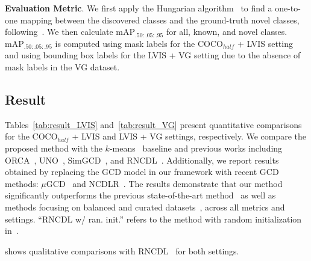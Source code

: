 
\vspace{1mm}
\noindent \textbf{Evaluation Metric}. 
We first apply the Hungarian algorithm~\cite{kuhn1955hungarian} to find a one-to-one mapping between the discovered classes and the ground-truth novel classes, following~\cite{fomenko2022learning}. We then calculate $\text{mAP}_{.50:.05:.95}$ for all, known, and novel classes. $\text{mAP}_{.50:.05:.95}$ is computed using mask labels for the COCO$_{half}$ + LVIS setting and using bounding box labels for the LVIS + VG setting due to the absence of mask labels in the VG dataset.



\subsection{Result}
Tables~\ref{tab:result_LVIS} and~\ref{tab:result_VG} present quantitative comparisons for the COCO$_{half}$ + LVIS and LVIS + VG settings, respectively. We compare the proposed method with the $k$-means~\cite{macqueen1967some} baseline and previous works including ORCA~\cite{cao2021open}, UNO~\cite{fini2021unified}, SimGCD~\cite{wen2023parametric}, and RNCDL~\cite{fomenko2022learning}. Additionally, we report results obtained by replacing the GCD model in our framework with recent GCD methods: $\mu$GCD~\cite{Vaze2023No} and NCDLR~\cite{zhang2023novel}. The results demonstrate that our method significantly outperforms the previous state-of-the-art method~\cite{fomenko2022learning} as well as methods focusing on balanced and curated datasets~\cite{cao2021open, fini2021unified, wen2023parametric}, across all metrics and settings. ``RNCDL w/ ran. init.'' refers to the method with random initialization in~\cite{fomenko2022learning}. 





 shows qualitative comparisons with RNCDL~\cite{fomenko2022learning} for both settings. %





